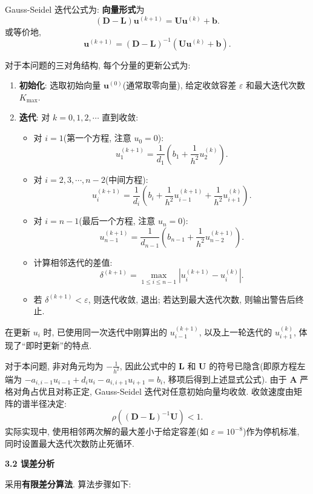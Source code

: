\documentclass[zihao=-4,a4paper]{ctexart}
\begin{document}
Gauss-Seidel 迭代公式为: \textbf{向量形式}为
\[
(\bm{D} - \bm{L})\bm{u}^{(k+1)} = \bm{U}\bm{u}^{(k)} + \bm{b}.
\]
或等价地,
\[
\bm{u}^{(k+1)} = (\bm{D} - \bm{L})^{-1}\left(\bm{U}\bm{u}^{(k)} + \bm{b}\right).
\]

对于本问题的三对角结构, 每个分量的更新公式为: 
\begin{enumerate}
    \item \textbf{初始化}: 选取初始向量 $\bm{u}^{(0)}$(通常取零向量), 给定收敛容差 $\varepsilon$ 和最大迭代次数 $K_{\max}$. 
    \item \textbf{迭代}: 对 $k=0,1,2,\cdots$ 直到收敛: 
    \begin{itemize}
        \item 对 $i = 1$(第一个方程, 注意 $u_0=0$): 
        \[
        u_1^{(k+1)} = \frac{1}{d_1}\left(b_1 + \frac{1}{h^2}u_2^{(k)}\right).
        \]
        \item 对 $i = 2,3,\cdots, n-2$(中间方程): 
        \[
        u_i^{(k+1)} = \frac{1}{d_i}\left(b_i + \frac{1}{h^2}u_{i-1}^{(k+1)} + \frac{1}{h^2}u_{i+1}^{(k)}\right).
        \]
        \item 对 $i = n-1$(最后一个方程, 注意 $u_n=0$): 
        \[
        u_{n-1}^{(k+1)} = \frac{1}{d_{n-1}}\left(b_{n-1} + \frac{1}{h^2}u_{n-2}^{(k+1)}\right).
        \]
        \item 计算相邻迭代的差值: 
        \[
        \delta^{(k+1)} = \max_{1\leq i\leq n-1} |u_i^{(k+1)} - u_i^{(k)}|.
        \]
        \item 若 $\delta^{(k+1)} < \varepsilon$, 则迭代收敛, 退出; 若达到最大迭代次数, 则输出警告后终止. 
    \end{itemize}
\end{enumerate}

在更新 $u_i$ 时, 已使用同一次迭代中刚算出的 $u_{i-1}^{(k+1)}$, 以及上一轮迭代的 $u_{i+1}^{(k)}$, 体现了“即时更新”的特点. 

对于本问题, 非对角元均为 $-\frac{1}{h^2}$, 因此公式中的 $\bm{L}$ 和 $\bm{U}$ 的符号已隐含(即原方程左端为 $-a_{i,i-1}u_{i-1} + d_i u_i - a_{i,i+1}u_{i+1} = b_i$, 移项后得到上述显式公式). 由于 $\bm{A}$ 严格对角占优且对称正定, Gauss-Seidel 迭代对任意初始向量均收敛. 收敛速度由矩阵的谱半径决定: 
\[
\rho\left((\bm{D}-\bm{L})^{-1}\bm{U}\right) < 1.
\]
实际实现中, 使用相邻两次解的最大差小于给定容差(如 $\varepsilon = 10^{-8}$)作为停机标准, 同时设置最大迭代次数防止死循环. 

\noindent\textbf{3.2 误差分析}

采用\textbf{有限差分算法}. 算法步骤如下:
\end{document}
